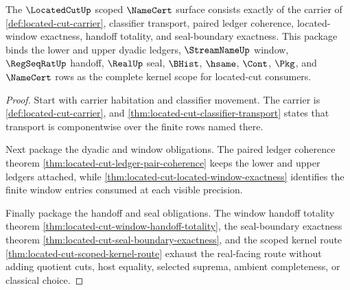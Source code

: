 \begin{theorem}
\label{thm:located-cut-obligation-scope-package}
The $\LocatedCutUp$ scoped $\NameCert$ surface consists exactly of the carrier of \autoref{def:located-cut-carrier}, classifier transport, paired ledger coherence, located-window exactness, handoff totality, and seal-boundary exactness. This package binds the lower and upper dyadic ledgers, $\StreamNameUp$ window, $\RegSeqRatUp$ handoff, $\RealUp$ seal, $\BHist$, $\hsame$, $\Cont$, $\Pkg$, and $\NameCert$ rows as the complete kernel scope for located-cut consumers.
\end{theorem}
\begin{proof}
Start with carrier habitation and classifier movement. The carrier is \autoref{def:located-cut-carrier}, and \autoref{thm:located-cut-classifier-transport} states that transport is componentwise over the finite rows named there.

Next package the dyadic and window obligations. The paired ledger coherence theorem \autoref{thm:located-cut-ledger-pair-coherence} keeps the lower and upper ledgers attached, while \autoref{thm:located-cut-located-window-exactness} identifies the finite window entries consumed at each visible precision.

Finally package the handoff and seal obligations. The window handoff totality theorem \autoref{thm:located-cut-window-handoff-totality}, the seal-boundary exactness theorem \autoref{thm:located-cut-seal-boundary-exactness}, and the scoped kernel route \autoref{thm:located-cut-scoped-kernel-route} exhaust the real-facing route without adding quotient cuts, host equality, selected suprema, ambient completeness, or classical choice.
\end{proof}

